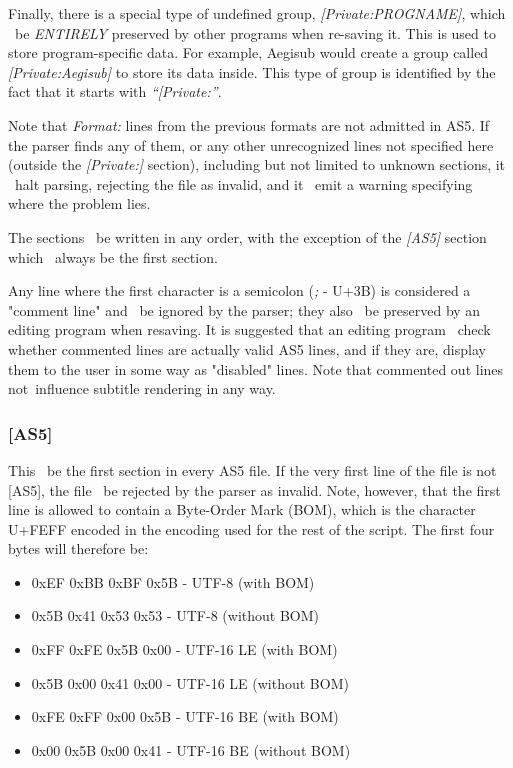 \documentclass{spec}
\begin{document}
Finally, there is a special type of undefined group, \emph{[Private:PROGNAME]}, which 
\must\ be \emph{ENTIRELY} preserved by other programs when re-saving it. This is used to
store program-specific data. For example, Aegisub would create a group called
\emph{[Private:Aegisub]} to store its data inside. This type of group is identified
by the fact that it starts with \emph{``[Private:''}.

Note that \emph{Format:} lines from the previous formats are not admitted in AS5. If the parser
finds any of them, or any other unrecognized lines not specified here (outside the \emph{[Private:]}
section), including but not limited to unknown sections, it \must\ halt parsing, rejecting the file
as invalid, and it \should\ emit a warning specifying where the problem lies.

The sections \may\ be written in any order, with the exception of the \emph{[AS5]} section which
\must\ always be the first section.

Any line where the first character is a semicolon (\textit{;} - U+3B) is considered a "comment line"
and \must\ be ignored by the parser; they also \must\ be preserved by an editing program when resaving.
It is suggested that an editing program \should\ check whether commented lines are actually valid AS5
lines, and if they are, display them to the user in some way as "disabled" lines. Note that commented
out lines \must not\ influence subtitle rendering in any way.

\subsubsection{[AS5]}
This \must\ be the first section in every AS5 file. If the very first line of the file is not
[AS5], the file \must\ be rejected by the parser as invalid. Note, however, that the first
line is allowed to contain a Byte-Order Mark (BOM), which is the character U+FEFF encoded in
the encoding used for the rest of the script\cite{Unicode BOM}. The first four bytes will therefore be:

\begin{itemize}
\item 0xEF 0xBB 0xBF 0x5B - UTF-8 (with BOM)
\item 0x5B 0x41 0x53 0x53 - UTF-8 (without BOM)
\item 0xFF 0xFE 0x5B 0x00 - UTF-16 LE (with BOM)
\item 0x5B 0x00 0x41 0x00 - UTF-16 LE (without BOM)
\item 0xFE 0xFF 0x00 0x5B - UTF-16 BE (with BOM)
\item 0x00 0x5B 0x00 0x41 - UTF-16 BE (without BOM)
\end{itemize}
\end{document}
